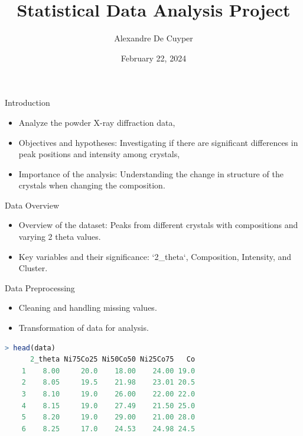 \documentclass[aspectratio=169]{beamer}
\title{Statistical Data Analysis Project}
\author{Alexandre De Cuyper}
\date{February 22, 2024}
\institute{University of A Coruña}
\begin{document}
\frame{\titlepage}

\begin{frame}{Introduction}
    \begin{itemize}
        \item Analyze the powder X-ray diffraction data,
        \item Objectives and hypotheses: Investigating if there are significant differences in peak positions and intensity among crystals,
        \item Importance of the analysis: Understanding the change in structure of the crystals when changing the composition.
    \end{itemize}
\end{frame}

\begin{frame}{Data Overview}
    \begin{itemize}
        \item Overview of the dataset: Peaks from different crystals with compositions and varying 2 theta values.
        \item Key variables and their significance: `2_theta`, Composition, Intensity, and Cluster.
    \end{itemize}
\end{frame}

\begin{frame}[fragile]{Data Preprocessing}
    \begin{itemize}
        \item Cleaning and handling missing values.
        \item Transformation of data for analysis.
    \end{itemize}

    \begin{lstlisting}[language=R]
    > head(data)
      2_theta Ni75Co25 Ni50Co50 Ni25Co75   Co
    1    8.00     20.0    18.00    24.00 19.0
    2    8.05     19.5    21.98    23.01 20.5
    3    8.10     19.0    26.00    22.00 22.0
    4    8.15     19.0    27.49    21.50 25.0
    5    8.20     19.0    29.00    21.00 28.0
    6    8.25     17.0    24.53    24.98 24.5
    \end{lstlisting}
\end{frame}
\end{document}
